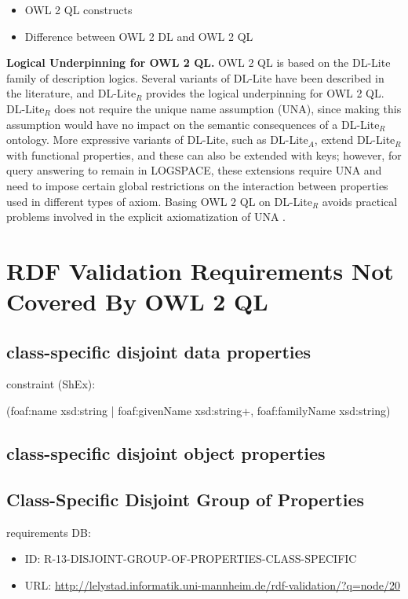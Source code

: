\documentclass{llncs}
\begin{document}
\begin{itemize}
  \item OWL 2 QL constructs
	\item Difference between OWL 2 DL and OWL 2 QL
\end{itemize}

\textbf{Logical Underpinning for OWL 2 QL.}
OWL 2 QL is based on the DL-Lite family of description logics. Several variants of DL-Lite have been described in the literature, and DL-Lite$_R$ provides the logical underpinning for OWL 2 QL. DL-Lite$_R$ does not require the unique name assumption (UNA), since making this assumption would have no impact on the semantic consequences of a DL-Lite$_R$ ontology. More expressive variants of DL-Lite, such as DL-Lite$_A$, extend DL-Lite$_R$ with functional properties, and these can also be extended with keys; however, for query answering to remain in LOGSPACE, these extensions require UNA and need to impose certain global restrictions on the interaction between properties used in different types of axiom. Basing OWL 2 QL on DL-Lite$_R$ avoids practical problems involved in the explicit axiomatization of UNA \cite{owl2profiles2008}. 

\section{RDF Validation Requirements Not Covered By OWL 2 QL}

\subsection{class-specific disjoint data properties}

constraint (ShEx):

\begin{ex}
(foaf:name xsd:string  | foaf:givenName xsd:string+, foaf:familyName xsd:string)
\end{ex}

\subsection{class-specific disjoint object properties}

\subsection{Class-Specific Disjoint Group of Properties}

requirements DB:
\begin{itemize}
  \item ID: R-13-DISJOINT-GROUP-OF-PROPERTIES-CLASS-SPECIFIC
	\item URL: \url{http://lelystad.informatik.uni-mannheim.de/rdf-validation/?q=node/20}
\end{itemize}
\end{document}
